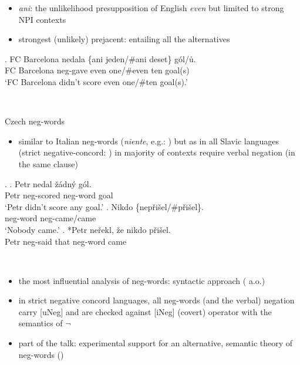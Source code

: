 \documentclass[
  ignorenonframetext,
]{beamer}
\providecommand{\tightlist}{%
  \setlength{\itemsep}{0pt}\setlength{\parskip}{0pt}}
\begin{document}
\begin{frame}
\begin{itemize}
\tightlist
\item
  \emph{ani}: the unlikelihood presupposition of English \emph{even} but
  limited to strong NPI contexts
\item
  strongest (unlikely) prejacent: entailing all the alternatives
\end{itemize}

\exg. FC Barcelona nedala \{ani jeden/\#ani deset\} gól/ů.\\
FC Barcelona neg-gave even one/\#even ten goal(s)\\
`FC Barcelona didn't score even one/\#ten goal(s).'

~
\end{frame}

\begin{frame}
Czech neg-words

\begin{itemize}
\tightlist
\item
  similar to Italian neg-words (\emph{niente}, e.g.:
  \citealt{ladusaw1992expressing}) but as in all Slavic languages
  (strict negative-concord: \citealt{zeijlstra2004sentential}) in
  majority of contexts require verbal negation (in the same clause)
\end{itemize}

\ex. \ag. Petr nedal žádný gól.\\
Petr neg-scored neg-word goal\\
`Petr didn't score any goal.' \bg. Nikdo \{nepřišel/\#přišel\}.\\
neg-word neg-came/came\\
`Nobody came.' \cg. *Petr neřekl, že nikdo přišel.\\
Petr neg-said that neg-word came\\
\hspace*{0.333em}

~
\end{frame}

\begin{frame}
\begin{itemize}
\tightlist
\item
  the most influential analysis of neg-words: syntactic approach
  (\citealt{zeijlstra2004sentential} a.o.)
\item
  in strict negative concord languages, all neg-words (and the verbal)
  negation carry {[}uNeg{]} and are checked against {[}iNeg{]} (covert)
  operator with the semantics of \(\neg\)
\item
  part of the talk: experimental support for an alternative, semantic
  theory of neg-words (\citealt{ovalle2004double,kuhn2022dynamics})
\end{itemize}
\end{frame}
\end{document}
